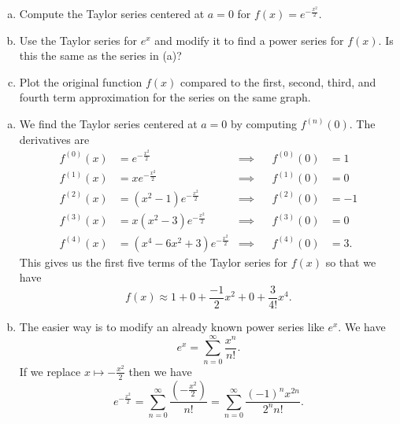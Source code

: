 \documentclass[12pt]{article} %
\begin{document}
\newpage
\begin{problem}~
\begin{enumerate}[(a)]
    \item Compute the Taylor series centered at $a=0$ for $f(x)=e^{-\frac{x^2}{2}}$.
    \item Use the Taylor series for $e^x$ and modify it to find a power series for $f(x)$. Is this the same as the series in (a)?
    \item Plot the original function $f(x)$ compared to the first, second, third, and fourth term approximation for the series on the same graph.
\end{enumerate}
\end{problem}
\begin{solution}
\begin{enumerate}[(a)]
    \item We find the Taylor series centered at $a=0$ by computing $f^{(n)}(0)$. The derivatives are
    \begin{align*}
        f^{(0)}(x) &= e^{-\frac{x^2}{2}} &\implies&& f^{(0)}(0)&=1\\
        f^{(1)}(x) &= xe^{-\frac{x^2}{2}} &\implies&& f^{(1)}(0)&=0\\
        f^{(2)}(x) &= (x^2-1)e^{-\frac{x^2}{2}} &\implies&& f^{(2)}(0)&=-1\\
        f^{(3)}(x) &= x(x^2-3)e^{-\frac{x^2}{2}} &\implies&& f^{(3)}(0)&=0\\
        f^{(4)}(x) &= (x^4-6x^2+3)e^{-\frac{x^2}{2}} &\implies&& f^{(4)}(0)&=3.
    \end{align*}
    This gives us the first five terms of the Taylor series for $f(x)$ so that we have
    \[
    f(x)\approx 1 + 0 + \frac{-1}{2}x^2 + 0 + \frac{3}{4!}x^4.
    \]
    
    \item The easier way is to modify an already known power series like $e^x$. We have
    \[
    e^x = \sum_{n=0}^\infty \frac{x^n}{n!}.
    \]
    If we replace $x\mapsto -\frac{x^2}{2}$ then we have
    \[
    e^{-\frac{x^2}{2}} = \sum_{n=0}^\infty \frac{ \left( -\frac{x^2}{2}\right)}{n!} = \sum_{n=0}^\infty \frac{(-1)^n x^{2n}}{2^n n!}.
    \]
    

\end{enumerate}
\end{solution}
\end{document}
